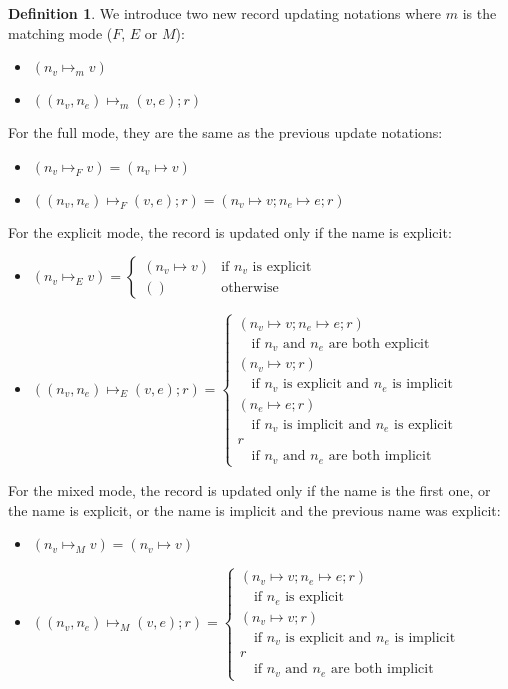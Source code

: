 \documentclass[14pt]{constructor-thesis}
\theoremstyle{definition}
\newtheorem{definition}{Definition}
\begin{document}
\begin{definition}
  We introduce two new record updating notations where $m$ is the matching mode ($F$, $E$ or $M$):
  \begin{itemize}
    \item $(n_v \mapsto_m v)$
    \item $((n_v, n_e) \mapsto_m (v, e); r)$
  \end{itemize}

  For the full mode, they are the same as the previous update notations:
  \begin{itemize}
    \item $(n_v \mapsto_F v) = (n_v \mapsto v)$
    \item $((n_v, n_e) \mapsto_F (v, e); r) = (n_v \mapsto v; n_e \mapsto e; r)$
  \end{itemize}

  For the explicit mode, the record is updated only if the name is explicit:
  \begin{itemize}
    \item $(n_v \mapsto_E v) =
      \begin{cases}
        (n_v \mapsto v) & \text{if $n_v$ is explicit} \\
        () & \text{otherwise}
      \end{cases}$
    \item $((n_v, n_e) \mapsto_E (v, e); r) = 
      \begin{cases}
        (n_v \mapsto v; n_e \mapsto e; r) \\ \quad \text{if $n_v$ and $n_e$ are both explicit} \\
        (n_v \mapsto v; r) \\ \quad \text{if $n_v$ is explicit and $n_e$ is implicit} \\
        (n_e \mapsto e; r) \\ \quad \text{if $n_v$ is implicit and $n_e$ is explicit} \\
        r \\ \quad \text{if $n_v$ and $n_e$ are both implicit}
      \end{cases}$
  \end{itemize}

  For the mixed mode, the record is updated only if the name is the first one, or the name is explicit, or the name is implicit and the previous name was explicit:
  \begin{itemize}
    \item $(n_v \mapsto_M v) = (n_v \mapsto v)$
    \item $((n_v, n_e) \mapsto_M (v, e); r) = 
      \begin{cases}
        (n_v \mapsto v; n_e \mapsto e; r) \\ \quad \text{if $n_e$ is explicit} \\
        (n_v \mapsto v; r) \\ \quad \text{if $n_v$ is explicit and $n_e$ is implicit} \\
        r \\ \quad \text{if $n_v$ and $n_e$ are both implicit}
      \end{cases}$
  \end{itemize}


\end{definition}
\end{document}
